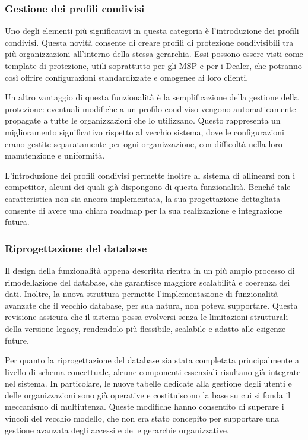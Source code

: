 \subsubsection{Gestione dei profili condivisi}
Uno degli elementi più significativi in questa categoria è l’introduzione dei profili condivisi. Questa novità consente di creare profili di protezione condivisibili tra più organizzazioni all'interno della stessa gerarchia. Essi possono essere visti come template di protezione, utili soprattutto per gli MSP e per i Dealer, che potranno così offrire configurazioni standardizzate e omogenee ai loro clienti.

Un altro vantaggio di questa funzionalità è la semplificazione della gestione della protezione: eventuali modifiche a un profilo condiviso vengono automaticamente propagate a tutte le organizzazioni che lo utilizzano. Questo rappresenta un miglioramento significativo rispetto al vecchio sistema, dove le configurazioni erano gestite separatamente per ogni organizzazione, con difficoltà nella loro manutenzione e uniformità.

L’introduzione dei profili condivisi permette inoltre al sistema di allinearsi con i competitor, alcuni dei quali già dispongono di questa funzionalità. Benché tale caratteristica non sia ancora implementata, la sua progettazione dettagliata consente di avere una chiara roadmap per la sua realizzazione e integrazione futura.

\subsubsection{Riprogettazione del database}
Il design della funzionalità appena descritta rientra in un più ampio processo di rimodellazione del database, che garantisce maggiore scalabilità e coerenza dei dati. Inoltre, la nuova struttura permette l’implementazione di funzionalità avanzate che il vecchio database, per sua natura, non poteva supportare. Questa revisione assicura che il sistema possa evolversi senza le limitazioni strutturali della versione legacy, rendendolo più flessibile, scalabile e adatto alle esigenze future.

Per quanto la riprogettazione del database sia stata completata principalmente a livello di schema concettuale, alcune componenti essenziali risultano già integrate nel sistema. In particolare, le nuove tabelle dedicate alla gestione degli utenti e delle organizzazioni sono già operative e costituiscono la base su cui si fonda il meccanismo di multiutenza. Queste modifiche hanno consentito di superare i vincoli del vecchio modello, che non era stato concepito per supportare una gestione avanzata degli accessi e delle gerarchie organizzative.

